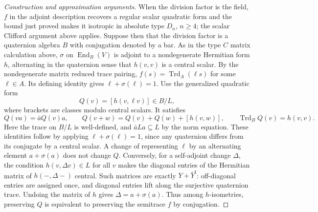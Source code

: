 \documentclass[11pt,a4paper,openany,oneside]{book}
\theoremstyle{resultstyle}
\theoremstyle{definition}
\numberwithin{equation}{chapter}
\begin{document}
\begin{proof}[Construction and approximation arguments]
When the division factor is the field, \(f\) in the adjoint
description recovers a regular scalar quadratic form and the
bound just proved makes it isotropic in absolute type \(D_n\),
\(n\ge4\); the scalar Clifford argument above applies. Suppose
then that the division factor is a quaternion algebra \(B\)
with conjugation denoted by a bar. As in the type \(C\)
matrix calculation above, \(\sigma\) on \(\operatorname{End}_B(V)\)
is adjoint to a nondegenerate Hermitian form \(h\), alternating
in the quaternion sense that \(h(v,v)\) is a central scalar.
By the nondegenerate matrix reduced trace pairing,
\(f(s)=\operatorname{Trd}_A(\ell s)\) for some \(\ell\in A\).
Its defining identity gives \(\ell+\sigma(\ell)=1\).
Use the generalized quadratic form
\[
 Q(v)=[h(v,\ell v)]\in B/L,
\]
where brackets are classes modulo central scalars. It satisfies
\[
 Q(va)=\bar a Q(v)a,\qquad
 Q(v+w)=Q(v)+Q(w)+[h(v,w)],\qquad
 \operatorname{Trd}_B Q(v)=h(v,v).
\]
Here the trace on \(B/L\) is well-defined, and
\(\bar a L a\subseteq L\) by the norm equation.
These identities follow by applying
\(\ell+\sigma(\ell)=1\), since any quaternion differs from its
conjugate by a central scalar. A change of representing \(\ell\)
by an alternating element \(a+\sigma(a)\) does not change \(Q\).
Conversely, for a self-adjoint change \(\Delta\), the condition
\(h(v,\Delta v)\in L\) for all \(v\) makes the diagonal entries
of the Hermitian matrix of \(h(-,\Delta-)\) central.
Such matrices are exactly \(Y+\bar Y^{\mathsf t}\): off-diagonal
entries are assigned once, and diagonal entries lift along
the surjective quaternion trace. Undoing the matrix of \(h\)
gives \(\Delta=a+\sigma(a)\). Thus among \(h\)-isometries,
preserving \(Q\) is equivalent to preserving the semitrace \(f\)
by conjugation.


\end{proof}
\end{document}
